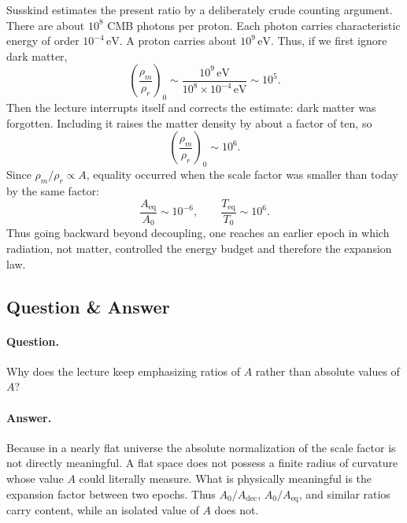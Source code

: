 Susskind estimates the present ratio by a deliberately crude counting argument. There are about \(10^8\) CMB photons per proton. Each photon carries characteristic energy of order \(10^{-4}\,\mathrm{eV}\). A proton carries about \(10^9\,\mathrm{eV}\). Thus, if we first ignore dark matter,
\begin{equation}
\left(\frac{\rho_m}{\rho_r}\right)_0
\sim
\frac{10^9\,\mathrm{eV}}{10^8 \times 10^{-4}\,\mathrm{eV}}
\sim 10^5.
\end{equation}
Then the lecture interrupts itself and corrects the estimate: dark matter was forgotten. Including it raises the matter density by about a factor of ten, so
\begin{equation}
\left(\frac{\rho_m}{\rho_r}\right)_0 \sim 10^6.
\end{equation}
Since \(\rho_m/\rho_r \propto A\), equality occurred when the scale factor was smaller than today by the same factor:
\begin{equation}
\frac{A_{\mathrm{eq}}}{A_0} \sim 10^{-6},
\qquad
\frac{T_{\mathrm{eq}}}{T_0} \sim 10^6.
\end{equation}
Thus going backward beyond decoupling, one reaches an earlier epoch in which radiation, not matter, controlled the energy budget and therefore the expansion law.

\subsection{Question \& Answer}

\paragraph{Question.} Why does the lecture keep emphasizing ratios of \(A\) rather than absolute values of \(A\)?

\paragraph{Answer.} Because in a nearly flat universe the absolute normalization of the scale factor is not directly meaningful. A flat space does not possess a finite radius of curvature whose value \(A\) could literally measure. What is physically meaningful is the expansion factor between two epochs. Thus \(A_0/A_{\mathrm{dec}}\), \(A_0/A_{\mathrm{eq}}\), and similar ratios carry content, while an isolated value of \(A\) does not.

